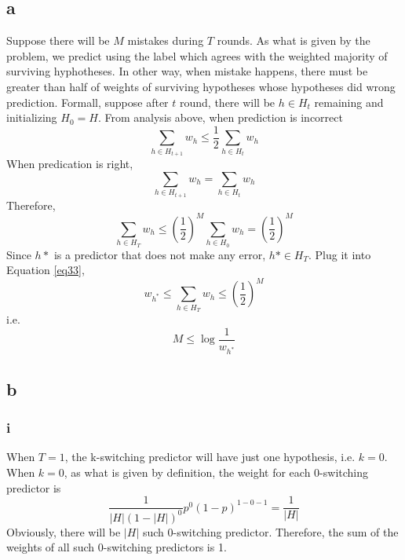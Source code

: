 \documentclass{article}
\begin{document}
	\subsection{a}
	Suppose there will be $M$ mistakes during $T$ rounds. As what is given by the problem, we predict using the label which agrees with the weighted majority of surviving hyphotheses. In other way, when mistake happens, there must be greater than half of weights of surviving hypotheses whose hypotheses did wrong prediction. Formall, suppose after $t$ round, there will be $h \in H_{t}$ remaining and initializing $H_{0}=H$. From analysis above, when prediction is incorrect
	\begin{equation}
	\sum_{h \in H_{t+1}}w_h \leq \frac{1}{2}\sum_{h\in H_t}w_h
	\label{eq31}
	\end{equation}
	When predication is right,
	\begin{equation}
	\sum_{h \in H_{t+1}}w_h = \sum_{h\in H_t}w_h
	\label{eq32}
	\end{equation}
	Therefore,
	\begin{equation}
	\sum_{h \in H_{T}}w_h \leq (\frac{1}{2})^M\sum_{h \in H_{0}}w_h=(\frac{1}{2})^M
	\label{eq33}
	\end{equation}
	Since $h*$ is a predictor that does not make any error, $h* \in H_{T}$. Plug it into Equation \ref{eq33},
	\begin{equation}
	w_{h^*} \leq \sum_{h \in H_{T}}w_h \leq (\frac{1}{2})^M
	\label{eq34}
	\end{equation}
	i.e.
	\begin{equation}
	M \leq \log\frac{1}{w_{h^*}}
	\label{eq35}
	\end{equation}

	\subsection{b}
	
	\subsubsection{i}
	When $T=1$, the k-switching predictor will have just one hypothesis, i.e. $k=0$.
	When $k=0$, as what is given by definition, the weight for each $0$-switching predictor is 
	\begin{equation}
	\frac{1}{|H|(1-|H|)^0}p^0(1-p)^{1-0-1}=\frac{1}{|H|}
	\label{eq36}
	\end{equation}
	Obviously, there will be $|H|$ such 0-switching predictor. Therefore, the sum of the weights of all such 0-switching predictors is 1.
\end{document}

